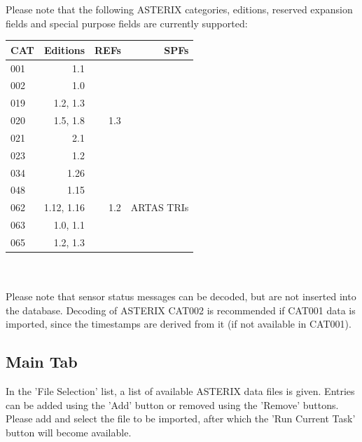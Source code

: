 Please note that the following ASTERIX categories, editions, reserved expansion fields and special purpose fields are currently supported: \\

\begin{tabular}{ | l | r | r | r |}
\hline
  CAT & Editions & REFs & SPFs  \\ \hline
  001 & 1.1 &  &  \\ \hline
  002 & 1.0 &  &  \\ \hline
  019 & 1.2, 1.3 & & \\ \hline
  020 & 1.5, 1.8 & 1.3 & \\ \hline
  021 & 2.1 & & \\ \hline
  023 & 1.2 & & \\ \hline
  034 & 1.26 & & \\ \hline
  048 & 1.15 & & \\ \hline
  062 & 1.12, 1.16 & 1.2 & ARTAS TRIs \\ \hline
  063 & 1.0, 1.1 & & \\ \hline
  065 & 1.2, 1.3 & & \\ \hline
\end{tabular} \\
\  \\

Please note that sensor status messages can be decoded, but are not inserted into the database. Decoding of ASTERIX CAT002 is recommended if CAT001 data is imported, since the timestamps are derived from it (if not available in CAT001).

\subsection{Main Tab}

In the 'File Selection' list, a list of available ASTERIX data files is given. Entries can be added using the 'Add' button or removed using the 'Remove' buttons. \\

Please add and select the file to be imported, after which the 'Run Current Task' button will become available. \\

